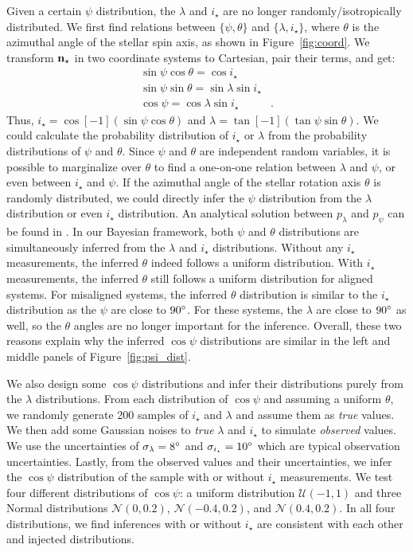 \documentclass[twocolumn,times]{aastex631}
\begin{document}
Given a certain $\psi$ distribution, the $\lambda$ and $i_\star$ are no longer randomly/isotropically distributed. We first find relations between $\{\psi, \theta\}$ and $\{\lambda, i_\star\}$, where $\theta$ is the azimuthal angle of the stellar spin axis, as shown in Figure~\ref{fig:coord}. We transform $\bf{n}_{\star}$ in two coordinate systems to Cartesian, pair their terms, and get:
\begin{align}
    \sin{\psi}\cos{\theta} = \cos{i_\star}& \nonumber\\
    \sin{\psi}\sin{\theta} = \sin{\lambda}\sin{i_\star}& \nonumber\\
    \cos{\psi} = \cos{\lambda}\sin{i_\star}&.
\end{align}
Thus, $i_\star = \cos[-1](\sin{\psi}\cos{\theta})$ and $\lambda = \tan[-1](\tan{\psi}\sin{\theta})$. 
We could calculate the probability distribution of $i_\star$ or $\lambda$ from the probability distributions of $\psi$ and $\theta$. Since $\psi$ and $\theta$ are independent random variables, it is possible to marginalize over $\theta$ to find a one-on-one relation between $\lambda$ and $\psi$, or even between $i_\star$ and $\psi$.
If the azimuthal angle of the stellar rotation axis $\theta$ is randomly distributed, we could directly infer the $\psi$ distribution from the $\lambda$ distribution or even $i_\star$ distribution.
An analytical solution between $p_\lambda$ and $p_\psi$ can be found in \cite{Fabrycky09}. 
In our Bayesian framework, both $\psi$ and $\theta$ distributions are simultaneously inferred from the $\lambda$ and $i_\star$ distributions. Without any $i_\star$ measurements, the inferred $\theta$ indeed follows a uniform distribution. With $i_\star$ measurements, the inferred $\theta$ still follows a uniform distribution for aligned systems. For misaligned systems, the inferred $\theta$ distribution is similar to the $i_\star$ distribution as the $\psi$ are close to $90\mbox{$^\circ$}$. For these systems, the $\lambda$ are close to $90\mbox{$^\circ$}$ as well, so the $\theta$ angles are no longer important for the inference. Overall, these two reasons explain why the inferred $\cos{\psi}$ distributions are similar in the left and middle panels of Figure~\ref{fig:psi_dist}.
 
We also design some $\cos{\psi}$ distributions and infer their distributions purely from the $\lambda$ distributions. From each distribution of $\cos{\psi}$ and assuming a uniform $\theta$, we randomly generate 200 samples of $i_\star$ and $\lambda$ and assume them as \emph{true} values. We then add some Gaussian noises to \emph{true} $\lambda$ and $i_\star$ to simulate \emph{observed} values. We use the uncertainties of $\sigma_{\lambda} = 8\mbox{$^\circ$}$ and $\sigma_{i_\star} = 10\mbox{$^\circ$}$ which are typical observation uncertainties. Lastly, from the observed values and their uncertainties, we infer the $\cos{\psi}$ distribution of the sample with or without $i_\star$ measurements.
We test four different distributions of $\cos{\psi}$: a uniform distribution $\mathcal{U}(-1,1)$ and three Normal distributions $\mathcal{N}(0,0.2)$, $\mathcal{N}(-0.4,0.2)$, and $\mathcal{N}(0.4,0.2)$.
In all four distributions, we find inferences with or without $i_\star$ are consistent with each other and injected distributions.
\end{document}
